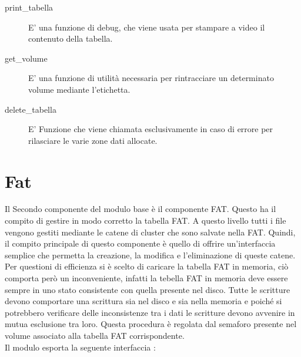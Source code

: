     \begin{description}
     \item[print\_tabella]
	E' una funzione di debug, che viene usata per stampare a video il contenuto della tabella. \\
     \end{description}
     
    \begin{description}
     \item[get\_volume]
	 E' una funzione di utilità necessaria per rintracciare un determinato volume mediante l'etichetta. \\
     \end{description}
 
    \begin{description}
      \item[delete\_tabella]
	E' Funzione che viene chiamata esclusivamente in caso di errore per rilasciare le varie zone dati allocate.\\
     \end{description}

\section{Fat}	
  Il Secondo componente del modulo base è il componente FAT. Questo ha il compito di gestire in modo corretto la tabella FAT. A questo livello tutti i file vengono gestiti mediante le catene di cluster che sono salvate
  nella FAT. Quindi, il compito principale di questo componente è quello di offrire un'interfaccia semplice che permetta la creazione, la modifica e l'eliminazione di queste catene.\\
  Per questioni di efficienza si è scelto di caricare la tabella FAT in memoria, ciò comporta però un inconveniente, infatti la tebella FAT in memoria deve essere sempre in uno stato consistente con quella presente nel disco. Tutte le scritture devono comportare una scrittura sia nel disco e sia nella memoria e poiché si potrebbero verificare delle inconsistenze tra i dati le scritture devono avvenire in mutua esclusione tra loro. 
  Questa procedura è regolata dal semaforo presente nel volume associato alla tabella FAT corrispondente.\\

  Il modulo esporta la seguente interfaccia  : \\
   
